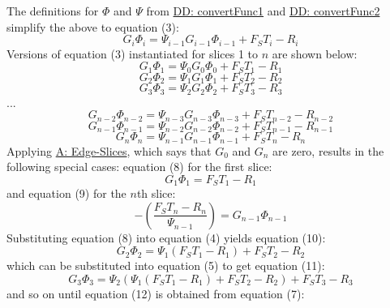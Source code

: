 \documentclass[12pt]{article}
\begin{document}
The definitions for $Φ$ and $Ψ$ from \hyperref[DD:convertFunc1]{DD: convertFunc1} and \hyperref[DD:convertFunc2]{DD: convertFunc2} simplify the above to equation (3):
\begin{displaymath}
G_{i} Φ_{i}=Ψ_{i-1} G_{i-1} Φ_{i-1}+{F_{S}} T_{i}-R_{i}
\end{displaymath}
Versions of equation (3) instantiated for slices 1 to $n$ are shown below:
\begin{displaymath}
G_{1} Φ_{1}=Ψ_{0} G_{0} Φ_{0}+{F_{S}} T_{1}-R_{1}
\end{displaymath}
\begin{displaymath}
G_{2} Φ_{2}=Ψ_{1} G_{1} Φ_{1}+{F_{S}} T_{2}-R_{2}
\end{displaymath}
\begin{displaymath}
G_{3} Φ_{3}=Ψ_{2} G_{2} Φ_{2}+{F_{S}} T_{3}-R_{3}
\end{displaymath}
...
\begin{displaymath}
G_{n-2} Φ_{n-2}=Ψ_{n-3} G_{n-3} Φ_{n-3}+{F_{S}} T_{n-2}-R_{n-2}
\end{displaymath}
\begin{displaymath}
G_{n-1} Φ_{n-1}=Ψ_{n-2} G_{n-2} Φ_{n-2}+{F_{S}} T_{n-1}-R_{n-1}
\end{displaymath}
\begin{displaymath}
G_{n} Φ_{n}=Ψ_{n-1} G_{n-1} Φ_{n-1}+{F_{S}} T_{n}-R_{n}
\end{displaymath}
Applying \hyperref[assumpES]{A: Edge-Slices}, which says that $G_{0}$ and $G_{n}$ are zero, results in the following special cases: equation (8) for the first slice:
\begin{displaymath}
G_{1} Φ_{1}={F_{S}} T_{1}-R_{1}
\end{displaymath}
and equation (9) for the $n$th slice:
\begin{displaymath}
-\left(\frac{{F_{S}} T_{n}-R_{n}}{Ψ_{n-1}}\right)=G_{n-1} Φ_{n-1}
\end{displaymath}
Substituting equation (8) into equation (4) yields equation (10):
\begin{displaymath}
G_{2} Φ_{2}=Ψ_{1} \left({F_{S}} T_{1}-R_{1}\right)+{F_{S}} T_{2}-R_{2}
\end{displaymath}
which can be substituted into equation (5) to get equation (11):
\begin{displaymath}
G_{3} Φ_{3}=Ψ_{2} \left(Ψ_{1} \left({F_{S}} T_{1}-R_{1}\right)+{F_{S}} T_{2}-R_{2}\right)+{F_{S}} T_{3}-R_{3}
\end{displaymath}
and so on until equation (12) is obtained from equation (7):
\end{document}
